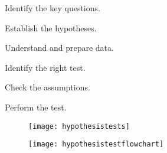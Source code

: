 	\begin{numberedlist}
		\item Identify the key questions.
		\item Establish the hypotheses.
		\item Understand and prepare data.
		\item Identify the right test.
		\item Check the assumptions.
		\item Perform the test.
	\end{numberedlist}

	\begin{figure}[tbp]
		\centering
		\texttt{[image: hypothesistests]}
		\caption{}
		\label{fig:hypothesistests}
	\end{figure}

	\begin{figure}[tbp]
		\centering
		\texttt{[image: hypothesistestflowchart]}
		\caption{}
		\label{fig:hypothesistestflowchart}
	\end{figure}



